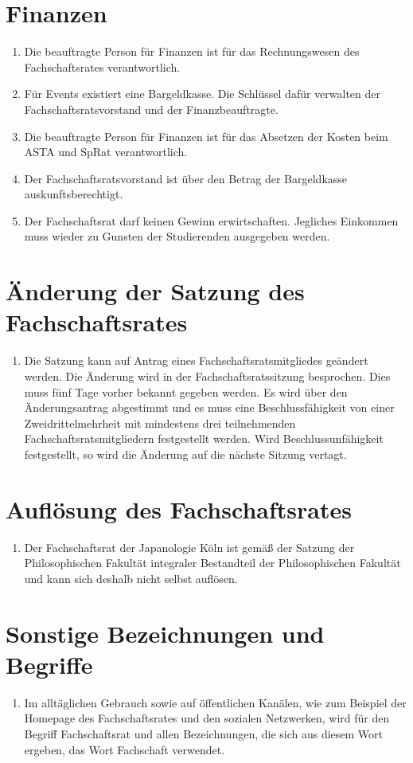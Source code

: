 \documentclass[12pt]{scrartcl}
\begin{document}
\section{Finanzen}

\begin{enumerate}
	\item Die beauftragte Person für Finanzen ist für das Rechnungswesen des Fachschaftsrates verantwortlich.
	\item Für Events existiert eine Bargeldkasse. Die Schlüssel dafür verwalten der Fachschaftsratsvorstand und der Finanzbeauftragte.
	\item Die beauftragte Person für Finanzen ist für das Absetzen der Kosten beim ASTA und SpRat verantwortlich.
	\item Der Fachschaftsratsvorstand ist über den Betrag der Bargeldkasse auskunftsberechtigt.
	\item Der Fachschaftsrat darf keinen Gewinn erwirtschaften. Jegliches Einkommen muss wieder zu Gunsten der Studierenden ausgegeben werden. 
\end{enumerate}

\section{Änderung der Satzung des Fachschaftsrates}

\begin{enumerate}
	\item Die Satzung kann auf Antrag eines Fachschaftsratsmitgliedes geändert werden. Die Änderung wird in der Fachschaftsratssitzung besprochen. Dies muss fünf Tage vorher bekannt gegeben werden. Es wird über den Änderungsantrag abgestimmt und es muss eine Beschlussfähigkeit von einer Zweidrittelmehrheit mit mindestens drei teilnehmenden Fachschaftsratsmitgliedern festgestellt werden. Wird Beschlussunfähigkeit festgestellt, so wird die Änderung auf die nächste Sitzung vertagt.
\end{enumerate}

\section{Auflösung des Fachschaftsrates}

\begin{enumerate}
	\item Der Fachschaftsrat der Japanologie Köln ist gemäß der Satzung der Philosophischen Fakultät integraler Bestandteil der Philosophischen Fakultät und kann sich deshalb nicht selbst auflösen. 
\end{enumerate}

\section{Sonstige Bezeichnungen und Begriffe}

\begin{enumerate}
	\item Im alltäglichen Gebrauch sowie auf öffentlichen Kanälen, wie zum Beispiel der Homepage des Fachschaftsrates und den sozialen Netzwerken, wird für den Begriff Fachschaftsrat und allen Bezeichnungen, die sich aus diesem Wort ergeben, das Wort Fachschaft verwendet. 
\end{enumerate}
\end{document}
